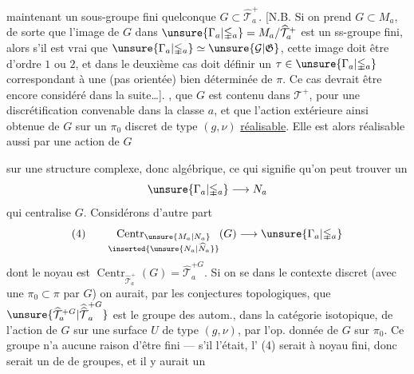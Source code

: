  maintenant un sous-groupe fini quelconque $G\subset\widehat{\mathcal T}_a^+$. [N.B. Si on prend  $G\subset M_a$, de sorte que l'image de $G$ dans $\unsure{\Gamma_a|\mathbb{\Gamma}_a}=M_a/\widehat{\mathcal T}_a^+$ est un ss-groupe fini, alors s'il  est vrai que $\unsure{\Gamma_a|\mathbb{\Gamma}_a}\simeq\unsure{\mathcal G|\mathfrak G}$,  cette image doit être d'ordre $1$ ou $2$, et dans le deuxième cas doit  définir un $\tau\in\unsure{\Gamma_a|\mathbb{\Gamma}_a}$ correspondant à une \uline{} (pas orientée) bien déterminée de $\pi$. Ce cas devrait être encore considéré dans la suite\ldots].   , que $G$ est contenu dans $\mathcal T^+$,  pour une discrétification convenable dans la classe $a$, et que l'action extérieure ainsi obtenue de $G$ sur un $\pi_0$ discret de type $(g,\nu)$   \uline{réalisable}. Elle est alors réalisable aussi par une action de $G$


sur une structure complexe, donc algébrique, ce qui signifie qu'on peut trouver un  
\[
\unsure{\Gamma_a|\mathbb{\Gamma}_a}\longrightarrow N_a
\]
qui centralise $G$. Considérons d'autre part
\[
(4)\qquad
\underset{\inserted{\unsure{N_a|\widehat N_a}}}{\operatorname{Centr}_{\unsure{M_a|N_a}}}(G)
\longrightarrow\unsure{\Gamma_a|\mathbb{\Gamma}_a}
\]
dont le noyau est $\operatorname{Centr}_{\widehat{\mathcal T}_a^+}(G)=\widehat{\mathcal T}_a^{+G}$.
Si on se  dans le contexte discret  (avec une  $\pi_0\subset\pi$  par $G$) on aurait, par les conjectures  topologiques, que $\unsure{\widehat{\mathcal T}_a^{+G}|\widehat{\widehat{\mathcal T}}_a^{+G}}$ est le groupe des autom., dans la catégorie isotopique, de l'action de $G$ sur une surface $U$ de type $(g,\nu)$,  par l'op.  donnée de $G$ sur $\pi_0$. Ce groupe n'a aucune raison d'être fini --- s'il l'était, l' (4) serait à noyau fini, donc serait un  de  de groupes, et il y aurait un

